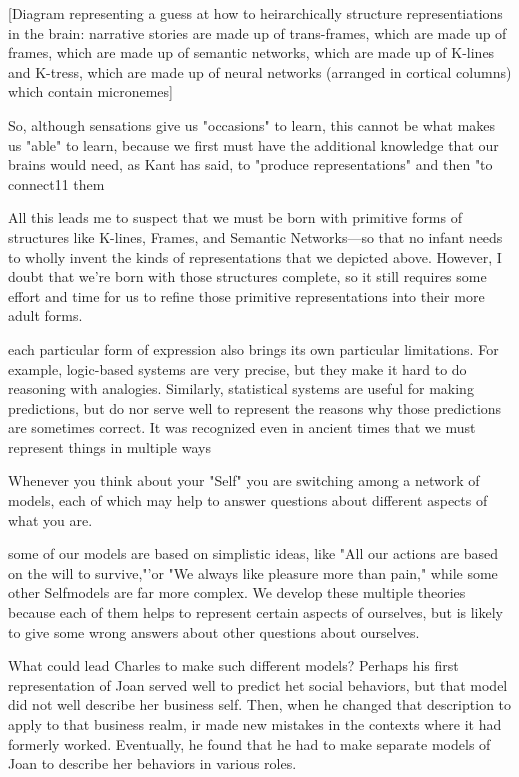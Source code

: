 \documentclass[10pt,a4paper]{article}
\begin{document}
[Diagram representing a guess at how to heirarchically structure representiations in the brain: narrative stories are made up of trans-frames, which are made up of frames, which are made up of semantic networks, which are made up of K-lines and K-tress, which are made up of neural networks (arranged in cortical columns) which contain micronemes] \cite[p.~293]{minsky}

So, although sensations give us "occasions" to learn, this cannot be what makes us "able" to learn, because we first must have the additional knowledge that our brains would need, as Kant has said, to "produce representations" and then "to connect11 them \cite[p.~294]{minsky}

All this leads me to suspect that we must be born with primitive forms of structures like K-lines, Frames, and Semantic Networks—so that no infant needs to wholly invent the kinds of representations that we depicted above. However, I doubt that we're born with those structures complete, so it still requires some effort and time for us to refine those primitive representations into their more adult forms. \cite[p.~294-295]{minsky}

each particular form of expression also brings its own particular limitations. For example, logic-based systems are very precise, but they make it hard to do reasoning with analogies. Similarly, statistical systems are useful for making predictions, but do nor serve well to represent the reasons why those predictions are sometimes correct. It was recognized even in ancient times that we must represent things in multiple ways \cite[p.~296]{minsky}

Whenever you think about your "Self" you are switching among
a network of models, each of which may help to answer questions
about different aspects of what you are. \cite[p.~300]{minsky}

some of our models are based on simplistic ideas, like "All our actions are based on the will to survive,"'or "We always like pleasure more than pain," while some other Selfmodels are far more complex. We develop these multiple theories because each of them helps to represent certain aspects of ourselves, but is likely to give some wrong answers about other questions about ourselves. \cite[p.~300]{minsky}

What could lead Charles to make such different models? Perhaps his first representation of Joan served well to predict het social behaviors, but that model did not well describe her business self. Then, when he changed that description to apply to that business realm, ir made new mistakes in the contexts where it had formerly worked. Eventually, he found that he had to make separate models of Joan to describe her behaviors in various roles. \cite[p.~302]{minsky}
\end{document}
